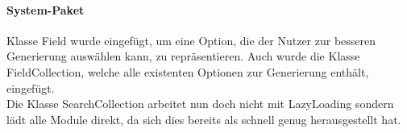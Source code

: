 \paragraph{System-Paket}
Klasse Field wurde eingefügt, um eine Option, die der Nutzer zur besseren Generierung auswählen kann, zu repräsentieren. Auch wurde die Klasse FieldCollection, welche alle existenten Optionen zur Generierung enthält, eingefügt.\\
Die Klasse SearchCollection arbeitet nun doch nicht mit LazyLoading sondern lädt alle Module direkt, da sich dies bereits als schnell genug herausgestellt hat.